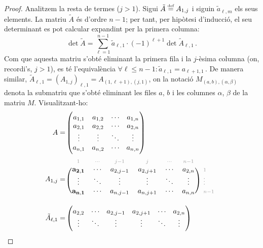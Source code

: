 \begin{lema}
\begin{proof}
		Analitzem la resta de termes ($j>1$). Sigui $\tilde{A} \stackrel{\text{\tiny def}}{=} A_{1,j}$ i siguin $\tilde{a}_{\ell,m}$ els seus elements. La matriu $\tilde{A}$ és d'ordre $n-1$; per tant, per hipòtesi d'inducció, el seu determinant es pot calcular expandint per la primera columna: 
		\begin{equation}\label{eq:subdet}
		\det \tilde{A} = \sum_{\ell=1}^{n-1}\tilde{a}_{\ell,1}\cdot (-1)^{\ell+1}\det \tilde{A}_{\ell,1}\,. 
		\end{equation} 
		Com que aquesta matriu s'obté eliminant la primera fila i la $j$-èsima columna (on, recordi's, $j>1$), es té l'equivalència $\forall \ell \le n-1 : {\tilde{a}_{\ell,1} = a_{\ell+1,1}}\,$. De manera similar, $\tilde{A}_{\ell,1} = (A_{1,j})_{\ell,1}= A_{(1,\ell+1),(j,1)}$, on la notació $M_{(a,b),(\alpha,\beta)}$ denota la submatriu que s'obté eliminant les files $a$, $b$ i les columnes $\alpha$, $\beta$ de la matriu $M$. Visualitzant-ho:
		\begin{equation*}
		\begin{split}
		A =&
		\begin{pmatrix}
		a_{1,1}&	a_{1,2}&	\cdots&		a_{1,n}\\
		a_{2,1}&	a_{2,2}&	\cdots&		a_{2,n}\\
		\vdots&		\vdots&		\ddots&		\vdots\\
		a_{n,1}&	a_{n,2}&	\cdots&		a_{n,n}
		\end{pmatrix}\\
		A_{1,j} =&\
		\begin{blockarray}{rcccccc}
		\begin{block}{*{7}{>{\scriptstyle\color[gray]{0.6}}c<{}}}
		1&	\cdots&	 j-1&	j&	\cdots&	n-1 &\\
		\end{block}
		\begin{block}{(cccccc)*{1}{>{\scriptstyle\color[gray]{0.6}}l<{}}}
		\mathbf{a_{2,1}}&\cdots&a_{2,j-1}&a_{2,j+1}&\cdots&		a_{2,n}& 1\\
		\vdots&	   \ddots&	\vdots&	\vdots&	\ddots&		\vdots& \vdots\\
		\mathbf{a_{n,1}}&   \cdots&	a_{n,j-1}&	a_{n,j+1}&	\cdots&		a_{n,n}&	n-1\\
		\end{block}
		\end{blockarray}\\
		\tilde{A}_{\ell,1} =&
		\begin{pmatrix}
		a_{2,2}&\cdots&a_{2,j-1}&a_{2,j+1}&\cdots&		a_{2,n}\\
		\vdots&	\ddots&	   \vdots&	\vdots&	\ddots&	\vdots\\

\end{pmatrix}
\end{split}
\end{equation*}
\end{proof}
\end{lema}
